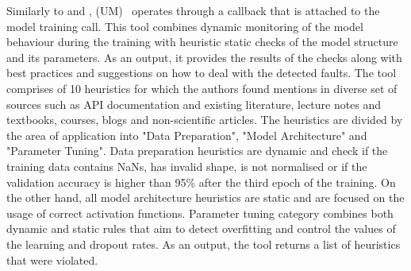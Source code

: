 Similarly to \DL and \DD, \UM (UM)~\cite{schoop2021umlaut} operates through a callback that is attached to the model training call. This tool
combines dynamic monitoring of the model behaviour during the training with
 heuristic static checks of the model structure and its parameters. As an output, it provides the results of the checks along with best practices and suggestions on how to deal with the detected faults. The tool comprises of 10 heuristics for which the authors found mentions in diverse set of sources such as API documentation and existing literature, lecture notes and textbooks, courses, blogs and non-scientific articles. The heuristics are divided by the area of application into "Data Preparation", "Model Architecture" and "Parameter Tuning". Data preparation heuristics are dynamic and check if the training data contains NaNs, has invalid shape, is not normalised or if the validation accuracy is higher than 95\% after the third epoch of the training. On the other hand, all model architecture heuristics are static and are focused on the usage of correct activation functions. Parameter tuning category combines both dynamic and static rules that aim to detect overfitting and control the values of the learning and dropout rates. As an output, the tool returns a list of heuristics that were violated.


